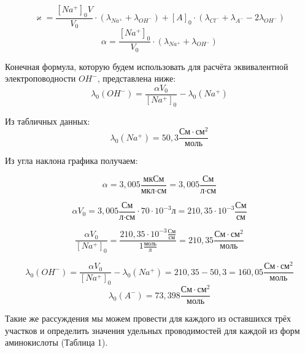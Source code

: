 \documentclass[a4paper, 11pt]{article}%
\begin{document}
    \[ \varkappa = \frac{[Na^{+}]_{0}V}{V_0} \cdot (\lambda_{Na^+} + \lambda_{OH^-}) + [A]_0 \cdot (\lambda_{Cl^-} + \lambda_{A^-} - 2\lambda_{OH^-})\]
    \[ \alpha =  \frac{[Na^{+}]_{0}}{V_0} \cdot (\lambda_{Na^+} + \lambda_{OH^-}) \]

    
    \par Конечная формула, которую будем использовать для расчёта эквивалентной электроповодности $OH^-$, представлена ниже:
    \[\lambda_{0}(OH^{-})=\frac{\alpha V_0}{[Na^{+}]_{0}}-\lambda_{0}(Na^{+})\]
    \par Из табличных данных:
    \[\lambda_{0}(Na^{+})=50,3 \frac{\text{См}\cdot\text{см}^{2}}{\text{моль}}\]
    \par Из угла наклона графика получаем:
    
    \[\alpha=3,005\frac{\text{мкСм}}{\text{мкл}\cdot\text{см}}=3,005\frac{\text{См}}{\text{л}\cdot\text{см}}\]

    \[\alpha V_{0} = 3,005\frac{\text{См}}{\text{л}\cdot\text{см}} \cdot 70 \cdot 10^{-3} \text{л}=210,35\cdot 10^{-3}\frac{\text{См}}{\text{см}}\]

    \[\frac{\alpha V_{0}}{[Na^{+}]_{0}} =\frac{210,35\cdot 10^{-3}\frac{\text{См}}{\text{см}}}{1\frac{\text{моль}}{\text{л}}}=210,35\frac{\text{См}\cdot\text{см}^{2}}{\text{моль}}\]

    \[\lambda_{0}(OH^{-})=\frac{\alpha V_0}{[Na^{+}]_{0}}-\lambda_{0}(Na^{+})=210,35-50,3=160,05\frac{\text{См}\cdot\text{см}^{2}}{\text{моль}}\]
    \[\lambda_{0}(A^{-})= 73,398\frac{\text{См}\cdot\text{см}^{2}}{\text{моль}}\]
    \par Такие же рассуждения мы можем провести для каждого из оставшихся трёх участков и определить значения удельных проводимостей для каждой из форм аминокислоты (Таблица 1). 
\end{document}
